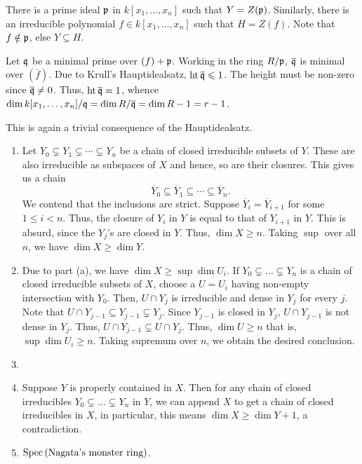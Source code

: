 \begin{exercise}
    There is a prime ideal $\mathfrak{p}$ in $k[x_1,\dots,x_n]$ such that $Y = Z(\mathfrak{p})$. Similarly, there is an irreducible polynomial $f\in k[x_1,\dots,x_n]$ such that $H = Z(f)$. Note that $f\notin\mathfrak{p}$, else $Y\subseteq H$.

    Let $\mathfrak{q}$ be a minimal prime over $(f) + \mathfrak{p}$. Working in the ring $R/\mathfrak{p}$, $\overline{\mathfrak{q}}$ is minimal over $(\overline f)$. Due to Krull's Hauptidealsatz, $\operatorname{ht}\overline{\mathfrak{q}}\leqslant 1$. The height must be non-zero since $\overline{\mathfrak{q}}\ne 0$. Thus, $\operatorname{ht}\overline{\mathfrak{q}} = 1$, whence $\dim k[x_1,\dots,x_n]/\mathfrak{q} = \dim R/\overline{\mathfrak{q}} = \dim R - 1 = r - 1$.
\end{exercise}

\begin{exercise}
    This is again a trivial consequence of the Hauptidealsatz.
\end{exercise}

\begin{exercise}
\begin{enumerate}[label=(\alph*)]
    \item Let $Y_0\subsetneq Y_1\subsetneq\cdots\subsetneq Y_n$ be a chain of closed irreducible subsets of $Y$. These are also irreducible as subspaces of $X$ and hence, so are their closures. This gives us a chain 
    \begin{equation*}
        \overline Y_0\subseteq \overline Y_1\subseteq\cdots\subseteq\overline Y_n.
    \end{equation*}
    We contend that the inclusions are strict. Suppose $\overline Y_i = \overline Y_{i + 1}$ for some $1\le i < n$. Thus, the closure of $Y_i$ in $Y$ is equal to that of $Y_{i + 1}$ in $Y$. This is absurd, since the $Y_j$'s are closed in $Y$. Thus, $\dim X\ge n$. Taking $\sup$ over all $n$, we have $\dim X\ge \dim Y$.
    \item Due to part (a), we have $\dim X\ge\sup\dim U_i$. If $Y_0\subsetneq\dots\subsetneq Y_n$ is a chain of closed irreducible subsets of $X$, choose a $U = U_i$ having non-empty intersection with $Y_0$. Then, $U\cap Y_j$ is irreducible and dense in $Y_j$ for every $j$. Note that $U\cap Y_{j - 1}\subseteq Y_{j - 1}\subsetneq Y_j$. Since $Y_{j - 1}$ is closed in $Y_j$, $U\cap Y_{j - 1}$ is not dense in $Y_j$. Thus, $U\cap Y_{j - 1}\subsetneq U\cap Y_j$. Thus, $\dim U\ge n$ that is, $\sup\dim U_i\ge n$. Taking supremum over $n$, we obtain the desired conclusion.
    \item 
    \item Suppose $Y$ is properly contained in $X$. Then for any chain of closed irreducibles $Y_0\subsetneq\dots\subsetneq Y_n$ in $Y$, we can append $X$ to get a chain of closed irreducibles in $X$, in particular, this means $\dim X\ge\dim Y + 1$, a contradiction. 
    \item $\operatorname{Spec}\left(\text{Nagata's monster ring}\right)$.
\end{enumerate}
\end{exercise}